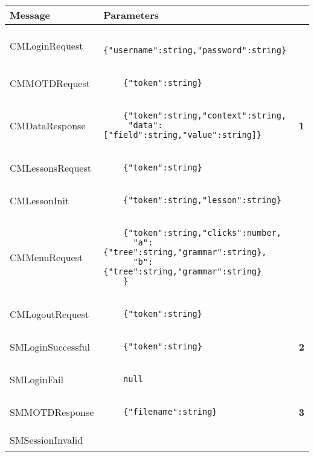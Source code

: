 \documentclass{scrartcl}
\begin{document}
\begin{tabular}{lll}
  Message & Parameters \\
  \hline
  CMLoginRequest &
  \begin{lstlisting}
    {"username":string,"password":string}
  \end{lstlisting} \\
  \hline
  CMMOTDRequest &
  \begin{lstlisting}
    {"token":string}
  \end{lstlisting} \\
  \hline
  CMDataResponse &
  \begin{lstlisting}
    {"token":string,"context":string,
     "data":["field":string,"value":string]}
  \end{lstlisting} & {\bfseries\footnotesize 1} \\
  \hline
  CMLessonsRequest &
  \begin{lstlisting}
    {"token":string}
  \end{lstlisting} \\
  \hline
  CMLessonInit &
  \begin{lstlisting}
    {"token":string,"lesson":string}
  \end{lstlisting} \\
  \hline
  CMMenuRequest &
  \begin{lstlisting}
    {"token":string,"clicks":number,
      "a":{"tree":string,"grammar":string},
      "b":{"tree":string,"grammar":string}
    }
  \end{lstlisting} \\
  \hline
  CMLogoutRequest &
  \begin{lstlisting}
    {"token":string}
  \end{lstlisting} \\
  \hline
  SMLoginSuccessful &
  \begin{lstlisting}
    {"token":string}
  \end{lstlisting} & {\bfseries\footnotesize 2} \\
  \hline
  SMLoginFail &
  \begin{lstlisting}
    null
  \end{lstlisting} \\
  \hline
  SMMOTDResponse &
  \begin{lstlisting}
    {"filename":string}
  \end{lstlisting} & {\bfseries\footnotesize 3} \\
  \hline
  SMSessionInvalid &
  \begin{lstlisting}

\end{lstlisting}
\end{tabular}
\end{document}
